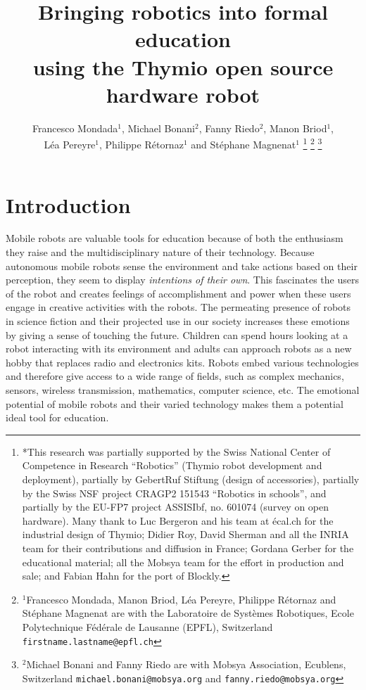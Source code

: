 \documentclass[letterpaper, 10 pt, conference]{ieeeconf}  %
\title{\LARGE \bf
Bringing robotics into formal education \\
using the Thymio open source hardware robot
}
\author{Francesco Mondada$^{1}$, Michael Bonani$^{2}$, Fanny Riedo$^{2}$, Manon Briod$^{1}$, \\
L\'ea Pereyre$^{1}$, Philippe R\'etornaz$^{1}$ and St\'ephane Magnenat$^{1}$%
\thanks{*This research was partially supported by the Swiss National Center of Competence in Research ``Robotics'' (Thymio robot development and deployment), partially by GebertRuf Stiftung (design of accessories), partially by the Swiss NSF project CRAGP2 151543 ``Robotics in schools'', and partially by the EU-FP7 project ASSISIbf, no. 601074 (survey on open hardware).
Many thank to Luc Bergeron and his team at écal.ch for the industrial design of Thymio; Didier Roy, David Sherman and all the INRIA team for their contributions and diffusion in France; Gordana Gerber for the educational material; all the Mobsya team for the effort in production and sale; and Fabian Hahn for the port of Blockly.}%
\thanks{$^{1}$Francesco Mondada, Manon Briod, L\'ea Pereyre, Philippe R\'etornaz and St\'ephane Magnenat are with the Laboratoire de Syst\`emes Robotiques,
        Ecole Polytechnique F\'ed\'erale de Lausanne (EPFL), Switzerland
        {\tt\small firstname.lastname@epfl.ch}}%
\thanks{$^{2}$Michael Bonani and Fanny Riedo are with Mobsya Association, Ecublens, Switzerland
        {\tt\small michael.bonani@mobsya.org} and {\tt\small fanny.riedo@mobsya.org}}%
}
\begin{document}
\maketitle
\thispagestyle{empty}
\pagestyle{empty}





\section{Introduction}

Mobile robots are valuable tools for education because of both the enthusiasm they raise and the multidisciplinary nature of their technology.
Because autonomous mobile robots sense the environment and take actions based on their perception, they seem to display \emph{intentions of their own}.
This fascinates the users of the robot and creates feelings of accomplishment and power when these users engage in creative activities with the robots.
The permeating presence of robots in science fiction and their projected use in our society increases these emotions by giving a sense of touching the future.
Children can spend hours looking at a robot interacting with its environment and adults can approach robots as a new hobby that replaces radio and electronics kits.
Robots embed various technologies and therefore give access to a wide range of fields, such as complex mechanics, sensors, wireless transmission, mathematics, computer science, etc.
The emotional potential of mobile robots and their varied technology makes them a potential ideal tool for education.
\end{document}
